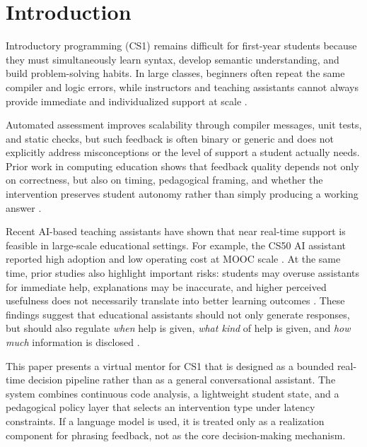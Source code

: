 \documentclass[conference]{IEEEtran}
\begin{document}
\section{Introduction}

Introductory programming (CS1) remains difficult for first-year students because they must simultaneously learn syntax, develop semantic understanding, and build problem-solving habits. In large classes, beginners often repeat the same compiler and logic errors, while instructors and teaching assistants cannot always provide immediate and individualized support at scale \cite{DesirableCharacteristicsforAITeachingAssistantsinProgrammingEducation,FeasibilityStudyofAugmentingTeachingAssistantswithAI}.

Automated assessment improves scalability through compiler messages, unit tests, and static checks, but such feedback is often binary or generic and does not explicitly address misconceptions or the level of support a student actually needs. Prior work in computing education shows that feedback quality depends not only on correctness, but also on timing, pedagogical framing, and whether the intervention preserves student autonomy rather than simply producing a working answer \cite{SystematicLiteratureReviewonLLM,DesirableCharacteristicsforAITeachingAssistantsinProgrammingEducation}.

Recent AI-based teaching assistants have shown that near real-time support is feasible in large-scale educational settings. For example, the CS50 AI assistant reported high adoption and low operating cost at MOOC scale \cite{ImprovingAIinCS50}. At the same time, prior studies also highlight important risks: students may overuse assistants for immediate help, explanations may be inaccurate, and higher perceived usefulness does not necessarily translate into better learning outcomes \cite{FeasibilityStudyofAugmentingTeachingAssistantswithAI,PatternsofLLMPoweredProgrammingAssistant,SystematicLiteratureReviewonLLM}. These findings suggest that educational assistants should not only generate responses, but should also regulate \emph{when} help is given, \emph{what kind} of help is given, and \emph{how much} information is disclosed \cite{CodeAid,IRIS,DesirableCharacteristicsforAITeachingAssistantsinProgrammingEducation}.

This paper presents a virtual mentor for CS1 that is designed as a bounded real-time decision pipeline rather than as a general conversational assistant. The system combines continuous code analysis, a lightweight student state, and a pedagogical policy layer that selects an intervention type under latency constraints. If a language model is used, it is treated only as a realization component for phrasing feedback, not as the core decision-making mechanism.
\end{document}
